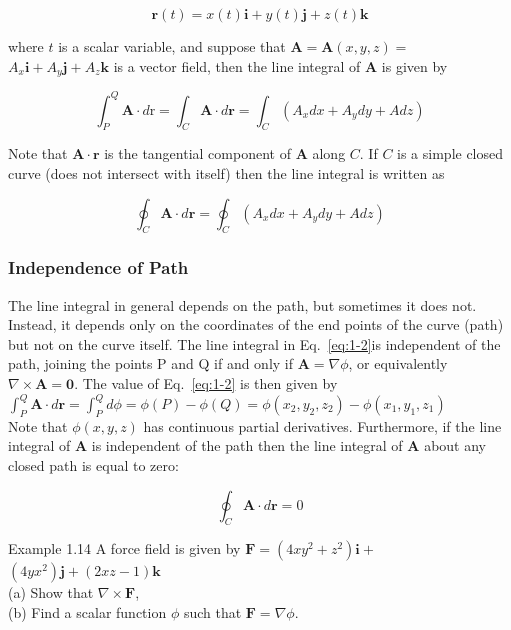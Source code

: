 \documentclass[10pt]{article}
\numberwithin{equation}{section}
\begin{document}
$$
\mathbf{r}(t)=x(t) \mathbf{i}+y(t) \mathbf{j}+z(t) \mathbf{k}
$$

where $t$ is a scalar variable, and suppose that $\mathbf{A}=\mathbf{A}(x, y, z)=$ $A_{x} \mathbf{i}+A_{y} \mathbf{j}+A_{z} \mathbf{k}$ is a vector field, then the line integral of $\mathbf{A}$ is given by


\begin{equation}
\int_{P}^{Q} \mathbf{A} \cdot d \mathrm{r}=\int_{C} \mathbf{A} \cdot d \mathbf{r}=\int_{C}\left(A_{x} d x+A_{y} d y+A d z\right) \label{eq:1-2}
\end{equation}


Note that $\mathbf{A} \cdot \mathbf{r}$ is the tangential component of $\mathbf{A}$ along $C$. If $C$ is a simple closed curve (does not intersect with itself) then the line integral is written as

$$
\oint_{C} \mathbf{A} \cdot d \mathbf{r}=\oint_{C}\left(A_{x} d x+A_{y} d y+A d z\right)
$$

\subsubsection{Independence of Path}\label{sec:1-10-2}
The line integral in general depends on the path, but sometimes it does not. Instead, it depends only on the coordinates of the end points of the curve (path) but not on the curve itself. The line integral in Eq.~\eqref{eq:1-2}is independent of the path, joining the points P and Q if and only if $\mathbf{A}=\nabla \phi$, or equivalently $\nabla \times \mathbf{A}=\mathbf{0}$. The value of Eq.~\eqref{eq:1-2} is then given by\\
$\int_{P}^{Q} \mathbf{A} \cdot d \mathbf{r}=\int_{P}^{Q} d \phi=\phi(P)-\phi(Q)=\phi\left(x_{2}, y_{2}, z_{2}\right)-\phi\left(x_{1}, y_{1}, z_{1}\right)$\\
Note that $\phi(x, y, z)$ has continuous partial derivatives. Furthermore, if the line integral of $\mathbf{A}$ is independent of the path then the line integral of $\mathbf{A}$ about any closed path is equal to zero:

$$
\oint_{C} \mathbf{A} \cdot d \mathbf{r}=0
$$

Example 1.14 A force field is given by $\mathbf{F}=\left(4 x y^{2}+z^{2}\right) \mathbf{i}+$ $\left(4 y x^{2}\right) \mathbf{j}+(2 x z-1) \mathbf{k}$\\
(a) Show that $\nabla \times \mathbf{F}$,\\
(b) Find a scalar function $\phi$ such that $\mathbf{F}=\nabla \phi$.
\end{document}
